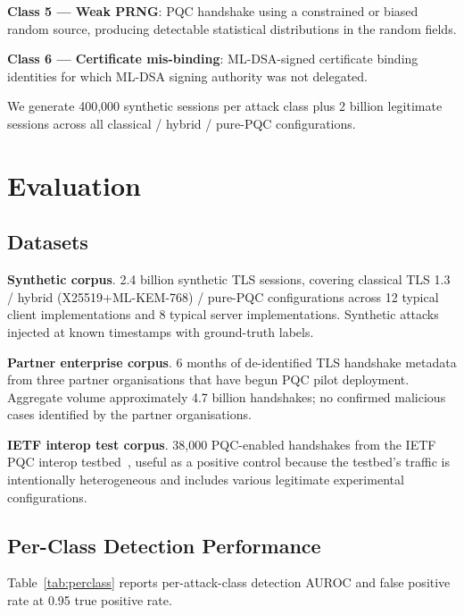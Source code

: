 \documentclass[sigconf,nonacm]{acmart}
\begin{document}
\textbf{Class 5 --- Weak PRNG}: PQC handshake using a constrained
or biased random source, producing detectable statistical
distributions in the random fields.

\textbf{Class 6 --- Certificate mis-binding}: ML-DSA-signed
certificate binding identities for which ML-DSA signing authority
was not delegated.

We generate 400{,}000 synthetic sessions per attack class plus
2 billion legitimate sessions across all classical / hybrid /
pure-PQC configurations.

\section{Evaluation}

\subsection{Datasets}

\textbf{Synthetic corpus}. 2.4 billion synthetic TLS sessions,
covering classical TLS 1.3 / hybrid (X25519+ML-KEM-768) / pure-PQC
configurations across 12 typical client implementations and 8
typical server implementations. Synthetic attacks injected at
known timestamps with ground-truth labels.

\textbf{Partner enterprise corpus}. 6 months of de-identified TLS
handshake metadata from three partner organisations that have
begun PQC pilot deployment. Aggregate volume approximately
4.7 billion handshakes; no confirmed malicious cases identified by
the partner organisations.

\textbf{IETF interop test corpus}. 38{,}000 PQC-enabled handshakes
from the IETF PQC interop testbed~\cite{ietf2024pqcinterop}, useful
as a positive control because the testbed's traffic is intentionally
heterogeneous and includes various legitimate experimental
configurations.

\subsection{Per-Class Detection Performance}

Table~\ref{tab:perclass} reports per-attack-class detection AUROC
and false positive rate at 0.95 true positive rate.
\end{document}
